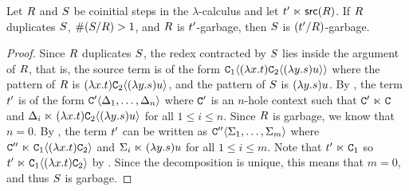 \begin{lemma}
Let $R$ and $S$ be coinitial steps in the $\lambda$-calculus
and let $t' \mathrel{\ltimes} \mathsf{src}(R)$.
If $R$ duplicates $S$, \ie $\#(S/R) > 1$,
and $R$ is $t'$-garbage,
then $S$ is $(t'/R)$-garbage.
\end{lemma}
\begin{proof}
Since $R$ duplicates $S$,
the redex contracted by $S$ 
lies inside the argument of $R$, that is,
the source term is of the form $\mathtt{C}_1\langle(\lambda x. t)\mathtt{C}_2\langle(\lambda y. s)u\rangle\rangle$
where the pattern of $R$ is $(\lambda x. t)\mathtt{C}_2\langle(\lambda y. s)u\rangle$,
and the pattern of $S$ is $(\lambda y. s)u$.
By ,
the term $t'$ is of the form $\mathtt{C}'\langle\Delta_1,\hdots,\Delta_n\rangle$
where $\mathtt{C}'$ is an $n$-hole context
such that $\mathtt{C}' \mathrel{\ltimes} \mathtt{C}$ and $\Delta_i \mathrel{\ltimes} (\lambda x. t)\mathtt{C}_2\langle(\lambda y. s)u\rangle$ for all $1 \leq i \leq n$.
Since $R$ is garbage, we know that $n = 0$.
By ,
the term $t'$ can be written as $\mathtt{C}''\langle\Sigma_1,\hdots,\Sigma_m\rangle$
where $\mathtt{C}'' \mathrel{\ltimes} \mathtt{C}_1\langle(\lambda x. t)\mathtt{C}_2\rangle$
and $\Sigma_i \mathrel{\ltimes} (\lambda y. s)u$ for all $1 \leq i \leq m$.
Note that $t' \mathrel{\ltimes} \mathtt{C}_1$ so $t' \mathrel{\ltimes} \mathtt{C}_1\langle(\lambda x. t)\mathtt{C}_2\rangle$
by .
Since the decomposition is unique, this means that $m = 0$,
and thus $S$ is garbage.
\end{proof}

